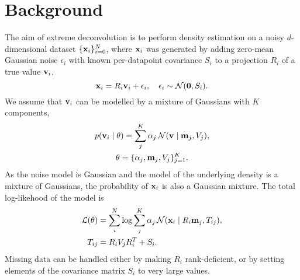 \section{Background}

The aim of extreme deconvolution is to perform density estimation on a noisy $d$-dimensional dataset $\{\mathbf{x}_i\}_{i=0}^N$, where $\mathbf{x}_i$ was generated by adding zero-mean Gaussian noise $\epsilon_i$ with known per-datapoint covariance $S_i$ to a projection $R_i$ of a true value $\mathbf{v}_i$,
\begin{equation}
  \mathbf{x}_i = R_i\mathbf{v}_i + \epsilon_i,\quad  \epsilon_i \sim \mathcal{N}(\mathbf{0}, S_i).
\end{equation}
We assume that $\mathbf{v}_i$ can be modelled by a mixture of Gaussians with $K$ components,
\begin{multline}
p(\mathbf{v}_i \mid \theta) = \sum_j^K \alpha_j \,\mathcal{N}(\mathbf{v} \mid \mathbf{m}_j, V_j), \\ \theta = \{\alpha_j, \mathbf{m}_j, V_j\}_{j=1} ^ K.
\end{multline}
As the noise model is Gaussian and the model of the underlying density is a mixture of Gaussians, the probability of $\mathbf{x}_i$ is also a Gaussian mixture.
The total log-likehood of the model is
\begin{align}
\mathcal{L}(\theta) &= \sum_i^N \log \sum_j^K \alpha_j\,\mathcal{N}(\mathbf{x}_i \mid R_i\mathbf{m}_j, T_{ij}), \\
T_{ij} &= R_iV_jR_i^T + S_i.
\end{align}
Missing data can be handled either by making $R_i$ rank-deficient, or by setting elements of the covariance matrix $S_i$ to very large values.
